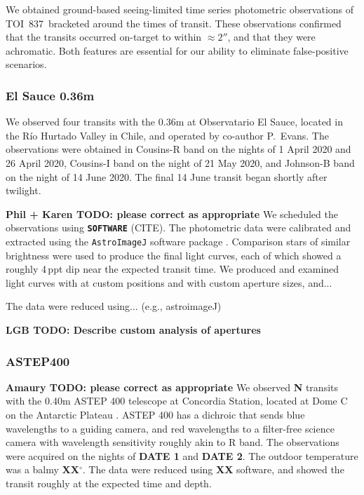 \documentclass[12pt,twocolumn,tighten]{aastex62}
\newcommand{\tn}{TOI~837} %
\begin{document}
We obtained ground-based seeing-limited time series photometric
observations of \tn\ bracketed around the times of transit.  These
observations confirmed that the transits occurred on-target to within
$\approx 2''$, and that they were achromatic. Both features are
essential for our ability to eliminate false-positive scenarios.

\subsubsection{El Sauce 0.36m}

We observed four transits with the 0.36m at Observatario El Sauce,
located in the R\'io Hurtado Valley in Chile, and operated by
co-author P{.}~Evans.  The observations were obtained in Cousins-R
band on the nights of 1 April 2020 and 26 April 2020, Cousins-I band
on the night of 21 May 2020, and Johnson-B band on the night of 14
June 2020.  The final 14 June transit began shortly after twilight.

{\bf Phil + Karen TODO: please correct as appropriate}
We scheduled the observations using {\bf \texttt{SOFTWARE}} (CITE).
The photometric data were calibrated and extracted using the
\texttt{AstroImageJ} software package
\citep{collins_astroimagej_2017}.  Comparison stars of similar
brightness were used to produce the final light curves, each of which
showed a roughly 4$\,$ppt dip near the expected transit time.
We produced and examined light curves with at custom positions and
with custom aperture sizes, and...

The data were reduced using... (e.g., astroimageJ)

{\bf LGB TODO: Describe custom analysis of apertures}


\subsubsection{ASTEP400}

{\bf Amaury TODO: please correct as appropriate}
We observed {\bf N} transits with the 0.40m ASTEP 400 telescope at
Concordia Station, located at Dome C on the Antarctic Plateau
\citep{daban_astep_2010}.  ASTEP 400 has a dichroic that sends blue
wavelengths to a guiding camera, and red wavelengths to a filter-free
science camera with wavelength sensitivity roughly akin to R band.
The observations were acquired on the nights of {\bf DATE 1} and {\bf
DATE 2}.  The outdoor temperature was a balmy {\bf XX$^\circ$}.  The
data were reduced using {\bf XX} software, and showed the transit
roughly at the expected time and depth.
\end{document}
